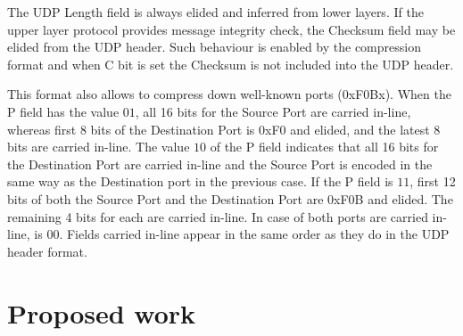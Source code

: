 \documentclass[12pt, titlepage, a4paper]{report}
\begin{document}
The UDP Length field is always elided and inferred from lower layers. If the upper layer protocol provides message integrity check, the Checksum field may be elided from the UDP header. Such behaviour is enabled by the compression format and when C bit is set the Checksum is not included into the UDP header.

This format also allows to compress down well-known ports (0xF0Bx).	When the P field has the value $01$, all 16 bits for the Source Port are carried in-line, whereas first 8 bits of the Destination Port is 0xF0 and elided, and the latest 8 bits are carried in-line. The value $10$ of the P field indicates that all 16 bits for the Destination Port are carried in-line and the Source Port is encoded in the same way as the Destination port in the previous case. If the P field is $11$, first 12 bits of both the Source Port and the Destination Port are 0xF0B and elided. The remaining 4 bits for each are carried in-line. In case of both ports are carried in-line, is $00$. Fields carried in-line appear in the same order as they do in the UDP header format.  




\chapter*{Proposed work}

\newpage



\nocite{ieee802.15.4} 
\nocite{eui64} 
\nocite{rfc780}
\nocite{rfc2460}
\nocite{rfc2464}
\nocite{rfc2474}
\nocite{rfc3168}
\nocite{rfc3775}
\nocite{rfc4291} 
\nocite{rfc4443}
\nocite{rfc4861}
\nocite{rfc4862}
\nocite{rfc4919}
\nocite{rfc4944} 
\nocite{draft-usecases-05} 
\nocite{draft-hc-06} 
\nocite{draft-nd-07}
\end{document}

